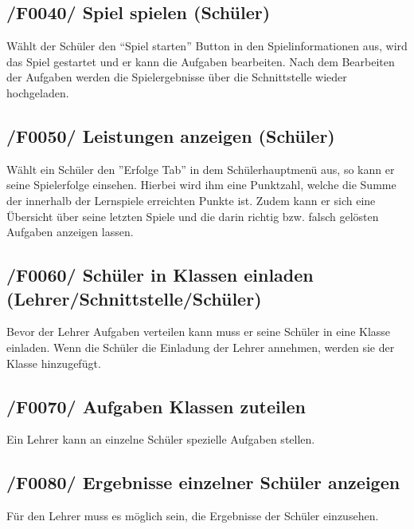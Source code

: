 \subsection{/F0040/ Spiel spielen (Schüler)}
Wählt der Schüler den “Spiel starten” Button in den Spielinformationen aus, wird das Spiel gestartet und  er kann die Aufgaben bearbeiten. Nach dem Bearbeiten der Aufgaben werden die Spielergebnisse über die Schnittstelle wieder hochgeladen.



\subsection{/F0050/ Leistungen anzeigen (Schüler)}
Wählt ein Schüler den ''Erfolge Tab'' in dem Schülerhauptmenü aus, so kann er seine Spielerfolge einsehen. Hierbei wird ihm eine Punktzahl, welche die Summe der innerhalb der Lernspiele erreichten Punkte ist. Zudem kann er sich eine Übersicht über seine letzten Spiele und die darin richtig bzw. falsch gelösten Aufgaben anzeigen lassen.

\subsection{/F0060/ Schüler in Klassen einladen (Lehrer/Schnittstelle/Schüler)}
Bevor der Lehrer Aufgaben verteilen kann muss er seine Schüler in eine Klasse einladen. Wenn die Schüler die Einladung der Lehrer annehmen, werden sie der Klasse hinzugefügt.

\subsection{/F0070/ Aufgaben Klassen zuteilen}
Ein Lehrer kann an einzelne Schüler spezielle Aufgaben stellen.

\subsection{/F0080/ Ergebnisse einzelner Schüler anzeigen}
Für den Lehrer muss es möglich sein, die Ergebnisse der Schüler einzusehen.
